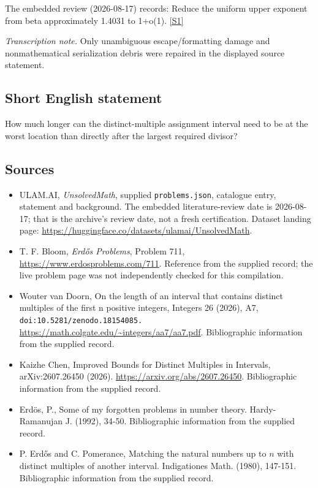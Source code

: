 \documentclass[11pt,a4paper]{article}
\newcommand{\sref}[2]{\hyperlink{source:#1:#2}{[S#2]}}
\begin{document}
The embedded review (2026-08-17) records: Reduce the uniform upper exponent from beta approximately 1.4031 to 1+o(1). \sref{statement}{1}

{\small\emph{Transcription note.} Only unambiguous escape/formatting damage and nonmathematical serialization debris were repaired in the displayed source statement.}

\subsection{Short English statement}

How much longer can the distinct-multiple assignment interval need to be at the worst location than directly after the largest required divisor?

\subsection{Sources}

{\small

\begin{itemize}

\item[\hypertarget{source:statement:1}{S1}] ULAM.AI, \emph{UnsolvedMath}, supplied \texttt{problems.json}, catalogue entry, statement and background. The embedded literature-review date is 2026-08-17; that is the archive’s review date, not a fresh certification. Dataset landing page: \url{https://huggingface.co/datasets/ulamai/UnsolvedMath}.

\item[\hypertarget{source:statement:2}{S2}] T. F. Bloom, \emph{Erdős Problems}, Problem 711, \url{https://www.erdosproblems.com/711}. Reference from the supplied record; the live problem page was not independently checked for this compilation.

\item[\hypertarget{source:statement:3}{S3}] Wouter van Doorn, On the length of an interval that contains distinct multiples of the first n positive integers, Integers 26 (2026), A7, \nolinkurl{doi:10.5281/zenodo.18154085.} \url{https://math.colgate.edu/~integers/aa7/aa7.pdf}. Bibliographic information from the supplied record.

\item[\hypertarget{source:statement:4}{S4}] Kaizhe Chen, Improved Bounds for Distinct Multiples in Intervals, arXiv:2607.26450 (2026). \url{https://arxiv.org/abs/2607.26450}. Bibliographic information from the supplied record.

\item[\hypertarget{source:statement:5}{S5}] Erd\"{o}s, P., Some of my forgotten problems in number theory. Hardy-Ramanujan J. (1992), 34-50. Bibliographic information from the supplied record.

\item[\hypertarget{source:statement:6}{S6}] P. Erd\H{o}s and C. Pomerance, Matching the natural numbers up to $n$ with distinct multiples of another interval. Indigationes Math. (1980), 147-151. Bibliographic information from the supplied record.

\end{itemize}

}

\label{end:statement}
\end{document}
